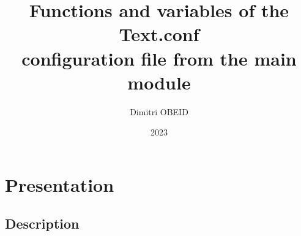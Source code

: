 \documentclass[a4paper,10pt]{article}
\title{\color{sec1}Functions and variables of the \color{path}Text.conf\color{sec1}\\configuration file from the main module}\color{text}
\author{Dimitri OBEID}
\date{2023}
\begin{document}
    \maketitle
    \newpage

    \hypertarget{contents}{}
    \tableofcontents
    \newpage

    \color{sec1}
    \section{Presentation}\color{text}

    \color{sec2}
    \subsection{Description}\color{text}
\end{document}
